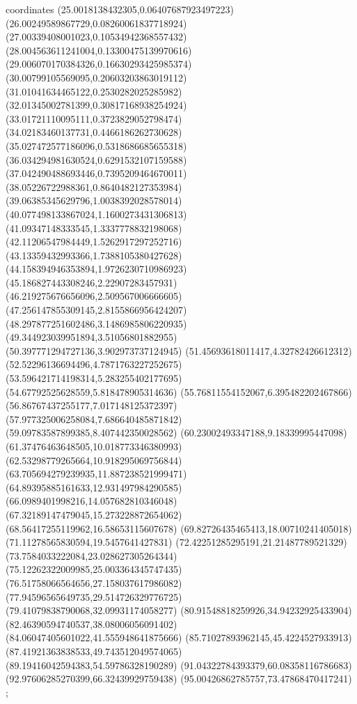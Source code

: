 coordinates {%
(25.0018138432305,0.06407687923497223)
(26.00249589867729,0.08260061837718924)
(27.00339408001023,0.10534942368557432)
(28.004563611241004,0.13300475139970616)
(29.006070170384326,0.16630293425985374)
(30.00799105569095,0.20603203863019112)
(31.01041634465122,0.2530282025285982)
(32.01345002781399,0.30817168938254924)
(33.01721110095111,0.3723829052798474)
(34.02183460137731,0.4466186262730628)
(35.027472577186096,0.5318686685655318)
(36.034294981630524,0.6291532107159588)
(37.042490488693446,0.7395209464670011)
(38.05226722988361,0.8640482127353984)
(39.06385345629796,1.0038392028578014)
(40.077498133867024,1.1600273431306813)
(41.09347148333545,1.3337778832198068)
(42.11206547984449,1.5262917297252716)
(43.13359432993366,1.7388105380427628)
(44.158394946353894,1.9726230710986923)
(45.186827443308246,2.22907283457931)
(46.219275676656096,2.509567006666605)
(47.256147855309145,2.8155866956424207)
(48.297877251602486,3.1486985806220935)
(49.344923039951894,3.51056801882955)
(50.397771294727136,3.902973737124945)
(51.45693618011417,4.32782426612312)
(52.52296136694496,4.7871763227252675)
(53.596421714198314,5.283255402177695)
(54.67792525628559,5.818478905314636)
(55.76811554152067,6.395482202467866)
(56.86767437255177,7.017148125372397)
(57.977325006258084,7.686640485871842)
(59.09783587899385,8.407442350028562)
(60.23002493347188,9.18339995447098)
(61.37476463648505,10.018773346380993)
(62.53298779265664,10.918295069756844)
(63.705694279239935,11.887238521999471)
(64.89395885161633,12.931497984290585)
(66.0989401998216,14.057682810346048)
(67.32189147479045,15.273228872654062)
(68.56417255119962,16.58653115607678)
(69.82726435465413,18.00710241405018)
(71.11278565830594,19.5457641427831)
(72.42251285295191,21.21487789521329)
(73.7584033222084,23.028627305264344)
(75.12262322009985,25.003364345747435)
(76.51758066564656,27.158037617986082)
(77.94596565649735,29.514726329776725)
(79.41079838790068,32.09931174058277)
(80.91548818259926,34.94232925433904)
(82.46390594740537,38.08006056091402)
(84.06047405601022,41.555948641875666)
(85.71027893962145,45.4224527933913)
(87.41921363838533,49.743512049574065)
(89.19416042594383,54.59786328190289)
(91.04322784393379,60.08358116786683)
(92.97606285270399,66.32439929759438)
(95.00426862785757,73.47868470417241)
};
